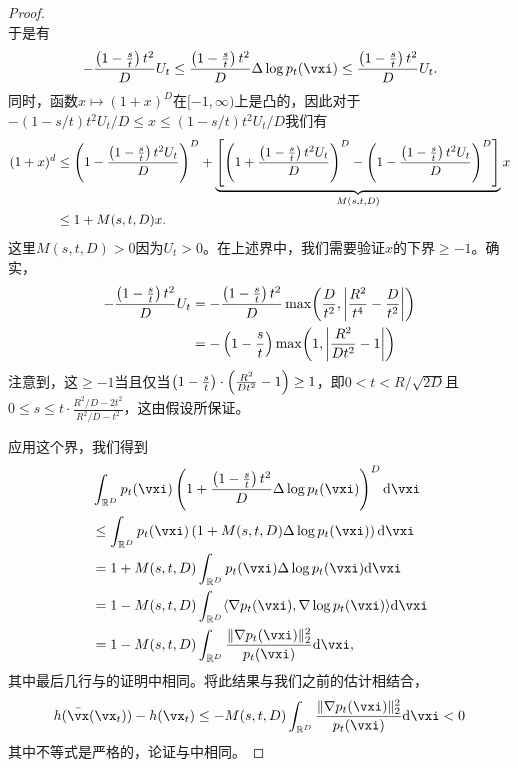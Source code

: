 \documentclass[../../book-main_zh.tex]{subfiles}
\begin{document}
\begin{proof}
\begin{equation}
    \end{equation}
    于是有
    \begin{equation}
        -\frac{\bp{1 - \frac{s}{t}}t^{2}}{D}U_{t} \leq \frac{\bp{1 - \frac{s}{t}}t^{2}}{D}\Delta \log p_{t}(\vxi) \leq \frac{\bp{1 - \frac{s}{t}}t^{2}}{D}U_{t}.
    \end{equation}
    同时，函数\(x \mapsto (1 + x)^{D}\)在\([-1, \infty)\)上是凸的，因此对于
    \(-(1-s/t)t^{2}U_{t}/D \leq x \leq (1-s/t)t^{2}U_{t}/D\)我们有
    \begin{align}
        (1 + x)^{d} 
        &\leq \left(1 - \frac{\left(1 - \frac{s}{t}\right)t^{2}U_{t}}{D}\right)^{D} + \underbrace{\left[\left(1 + \frac{\left(1 - \frac{s}{t}\right)t^{2}U_{t}}{D}\right)^{D} - \left(1 - \frac{\left(1 - \frac{s}{t}\right)t^{2}U_{t}}{D}\right)^{D}\right]}_{M(s, t, D)}x \\ 
        &\leq 1 + M(s, t, D)x.
    \end{align}
    这里\(M(s, t, D) > 0\)因为\(U_{t} > 0\)。在上述界中，我们需要验证\(x\)的下界\(\geq -1\)。确实，
    \begin{align}
        -\frac{\bp{1 - \frac{s}{t}}t^{2}}{D}U_{t}
        &= -\frac{\bp{1 - \frac{s}{t}}t^{2}}{D}\max\rp{\frac{D}{t^{2}}, \abs*{\frac{R^{2}}{t^{4}} - \frac{D}{t^{2}}}} \\ 
        &= -\bp{1 - \frac{s}{t}}\max\rp{1, \abs*{\frac{R^{2}}{Dt^{2}} - 1}}
    \end{align}
    注意到，这\(\geq -1\)当且仅当\(\left(1 - \frac{s}{t}\right)\cdot\left(\frac{R^{2}}{Dt^{2}} - 1\right) \geq 1\)，即\(0 < t < R/\sqrt{2D}\)且\(0 \leq s \leq t\cdot\frac{R^{2}/D - 2t^{2}}{R^{2}/D - t^{2}}\)，这由假设所保证。
    
    应用这个界，我们得到
    \begin{align}
        &\int_{\R^{D}} p_{t}(\vxi)\bp{1 + \frac{\bp{1 - \frac{s}{t}}t^{2}}{D}\Delta \log p_{t}(\vxi)}^{D}\odif{\vxi} \\ 
        &\leq \int_{\R^{D}}p_{t}(\vxi)\bp{1 + M(s, t, D)\Delta \log p_{t}(\vxi)}\odif{\vxi} \\
        &= 1 + M(s, t, D)\int_{\R^{D}}p_{t}(\vxi)\Delta \log p_{t}(\vxi)\odif{\vxi} \\
        &= 1 - M(s, t, D)\int_{\R^{D}}\ip{\nabla p_{t}(\vxi)}{\nabla\log p_{t}(\vxi)}\odif{\vxi} \\
        &= 1 - M(s, t, D)\int_{\R^{D}}\frac{\norm{\nabla p_{t}(\vxi)}_{2}^{2}}{p_{t}(\vxi)}\odif{\vxi},
    \end{align}
    其中最后几行与的证明中相同。将此结果与我们之前的估计相结合，
    \begin{equation}
        h(\bar{\vx}(\vx_{t})) - h(\vx_{t}) \leq - M(s, t, D)\int_{\R^{D}}\frac{\norm{\nabla p_{t}(\vxi)}_{2}^{2}}{p_{t}(\vxi)}\odif{\vxi} < 0
    \end{equation}
    其中不等式是严格的，论证与中相同。
\end{proof}
\end{document}
